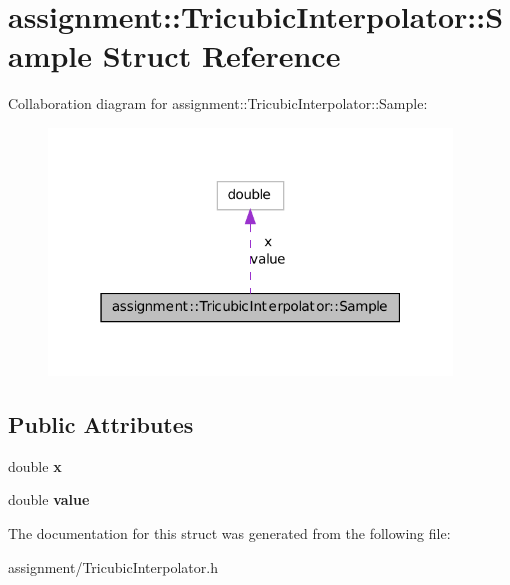 \hypertarget{structassignment_1_1_tricubic_interpolator_1_1_sample}{
\section{assignment::TricubicInterpolator::Sample Struct Reference}
\label{structassignment_1_1_tricubic_interpolator_1_1_sample}
}


Collaboration diagram for assignment::TricubicInterpolator::Sample:\nopagebreak
\begin{figure}[H]
\begin{center}
\leavevmode
\includegraphics[width=304pt]{structassignment_1_1_tricubic_interpolator_1_1_sample__coll__graph}
\end{center}
\end{figure}
\subsection*{Public Attributes}
\begin{DoxyCompactItemize}
\item 
\hypertarget{structassignment_1_1_tricubic_interpolator_1_1_sample_a859e3262a400f13ee9142961b740bf99}{
double {\bfseries x}}
\label{structassignment_1_1_tricubic_interpolator_1_1_sample_a859e3262a400f13ee9142961b740bf99}

\item 
\hypertarget{structassignment_1_1_tricubic_interpolator_1_1_sample_a19eb3045df3e68721eae31ea2179d284}{
double {\bfseries value}}
\label{structassignment_1_1_tricubic_interpolator_1_1_sample_a19eb3045df3e68721eae31ea2179d284}

\end{DoxyCompactItemize}


The documentation for this struct was generated from the following file:\begin{DoxyCompactItemize}
\item 
assignment/TricubicInterpolator.h\end{DoxyCompactItemize}

